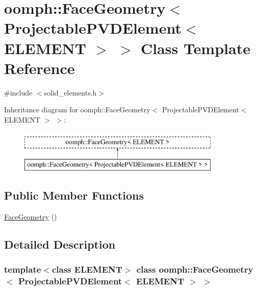 \hypertarget{classoomph_1_1FaceGeometry_3_01ProjectablePVDElement_3_01ELEMENT_01_4_01_4}{}\section{oomph\+:\+:Face\+Geometry$<$ Projectable\+P\+V\+D\+Element$<$ E\+L\+E\+M\+E\+NT $>$ $>$ Class Template Reference}
\label{classoomph_1_1FaceGeometry_3_01ProjectablePVDElement_3_01ELEMENT_01_4_01_4}


{\ttfamily \#include $<$solid\+\_\+elements.\+h$>$}

Inheritance diagram for oomph\+:\+:Face\+Geometry$<$ Projectable\+P\+V\+D\+Element$<$ E\+L\+E\+M\+E\+NT $>$ $>$\+:\begin{figure}[H]
\begin{center}
\leavevmode
\includegraphics[height=2.000000cm]{classoomph_1_1FaceGeometry_3_01ProjectablePVDElement_3_01ELEMENT_01_4_01_4}
\end{center}
\end{figure}
\subsection*{Public Member Functions}
\begin{DoxyCompactItemize}
\item 
\hyperlink{classoomph_1_1FaceGeometry_3_01ProjectablePVDElement_3_01ELEMENT_01_4_01_4_ac1546b75e995384c2f2552fcb282b348}{Face\+Geometry} ()
\end{DoxyCompactItemize}


\subsection{Detailed Description}
\subsubsection*{template$<$class E\+L\+E\+M\+E\+NT$>$\newline
class oomph\+::\+Face\+Geometry$<$ Projectable\+P\+V\+D\+Element$<$ E\+L\+E\+M\+E\+N\+T $>$ $>$}

